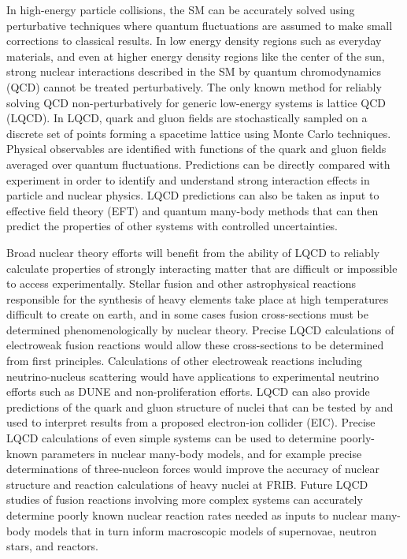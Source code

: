 In high-energy particle collisions, the SM can be accurately solved using perturbative techniques 
where quantum fluctuations are assumed to make small corrections to classical results.
In low energy density regions such as everyday materials,
and even at higher energy density regions like the center of the sun, 
strong nuclear interactions described in the SM by quantum chromodynamics (QCD) cannot be treated perturbatively.
The only known method for reliably solving QCD non-perturbatively for generic low-energy systems is lattice QCD (LQCD).
In LQCD, quark and gluon fields are stochastically sampled on a discrete set of points forming a spacetime lattice using Monte Carlo techniques.
Physical observables are identified with functions of the quark and gluon fields averaged over quantum fluctuations.
Predictions can be directly compared with experiment
in order to identify and understand strong interaction effects in particle and nuclear physics.
LQCD predictions can also be taken as input to effective field theory (EFT) and quantum many-body methods
that can then predict the properties of other systems with controlled uncertainties.

Broad nuclear theory efforts will benefit from the ability of LQCD to
reliably calculate properties of strongly interacting matter 
that are difficult or impossible to access experimentally.
Stellar fusion and other astrophysical reactions responsible for the synthesis of heavy elements take place at high temperatures difficult to create on earth, 
and in some cases fusion cross-sections must be determined phenomenologically by nuclear theory.
Precise LQCD calculations of electroweak fusion reactions would allow these cross-sections to be determined from first principles.
Calculations of other electroweak reactions including neutrino-nucleus scattering would have applications to experimental neutrino efforts such as DUNE and non-proliferation efforts.
LQCD can also provide predictions of the quark and gluon structure of nuclei that can be tested by and used to interpret results from a proposed electron-ion collider (EIC).
Precise LQCD calculations of even simple systems can be used to determine poorly-known parameters in nuclear many-body models,
and for example precise determinations of three-nucleon forces would improve the accuracy of nuclear structure and reaction calculations of heavy nuclei at FRIB.
Future LQCD studies of fusion reactions involving more complex systems
can accurately determine poorly known nuclear reaction rates
needed as inputs to nuclear many-body models 
that in turn inform
macroscopic models of supernovae, neutron stars, and reactors.

